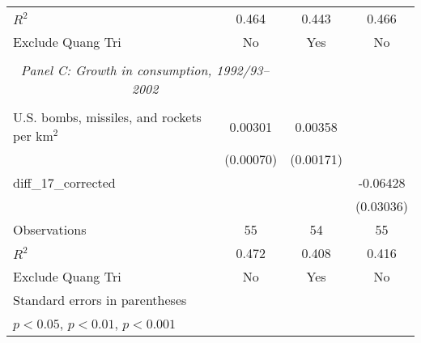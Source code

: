 \begin{table}[htbp]
\begin{tabular}{l*{3}{c}}
\(R^{2}\)           &       0.464         &       0.443         &       0.466         \\
Exclude Quang Tri   &          No         &         Yes         &          No         \\
\hline \\ \multicolumn{2}{c}{\emph{Panel C: Growth in consumption, 1992/93–2002}} \\\\[-1ex]
U.S. bombs, missiles, and rockets per km$^2$&     0.00301\sym{***}&     0.00358\sym{*}  &                     \\
                    &   (0.00070)         &   (0.00171)         &                     \\
[1em]
diff\_17\_corrected   &                     &                     &    -0.06428\sym{*}  \\
                    &                     &                     &   (0.03036)         \\
\hline
Observations        &          55         &          54         &          55         \\
\(R^{2}\)           &       0.472         &       0.408         &       0.416         \\
Exclude Quang Tri   &          No         &         Yes         &          No         \\
\hline\hline \multicolumn{5}{l}{\footnotesize Standard errors in parentheses}\\\multicolumn{3}{l}{\footnotesize \sym{*} \(p<0.05\), \sym{**} \(p<0.01\), \sym{***} \(p<0.001\)}\\ \end{tabular} \\ \end{table}
